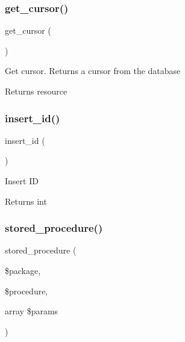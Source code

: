 \subsubsection{\texorpdfstring{get\+\_\+cursor()}{get\_cursor()}}
{\footnotesize\ttfamily get\+\_\+cursor (\begin{DoxyParamCaption}{ }\end{DoxyParamCaption})}

Get cursor. Returns a cursor from the database

\begin{DoxyReturn}{Returns}
resource 
\end{DoxyReturn}
\mbox{\label{class_c_i___d_b__oci8__driver_a933f2cde8dc7f87875e257d0a4902e99}} 
\subsubsection{\texorpdfstring{insert\+\_\+id()}{insert\_id()}}
{\footnotesize\ttfamily insert\+\_\+id (\begin{DoxyParamCaption}{ }\end{DoxyParamCaption})}

Insert ID

\begin{DoxyReturn}{Returns}
int 
\end{DoxyReturn}
\mbox{\label{class_c_i___d_b__oci8__driver_adb2007e6a64069385b285c77480d87b7}} 
\subsubsection{\texorpdfstring{stored\+\_\+procedure()}{stored\_procedure()}}
{\footnotesize\ttfamily stored\+\_\+procedure (\begin{DoxyParamCaption}\item[{}]{\$package,  }\item[{}]{\$procedure,  }\item[{array}]{\$params }\end{DoxyParamCaption})}

